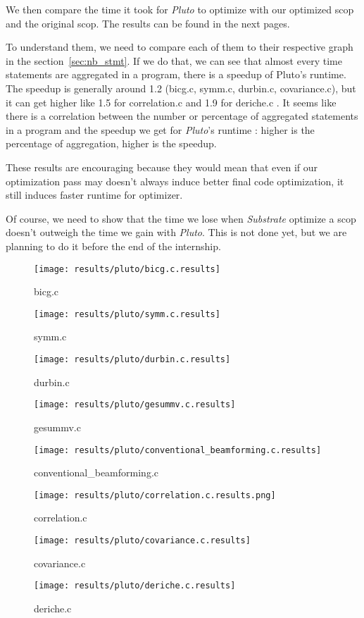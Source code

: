 \documentclass[paper=a4, fontsize=11.5pt]{scrartcl}
\numberwithin{equation}{section}        %
\numberwithin{figure}{section}          %
\numberwithin{table}{section}               %
\begin{document}
\bigskip

We then compare the time it took for \textit{Pluto} to optimize with our optimized scop and
the original scop. The results can be found in the next pages.

To understand them, we need to compare each of them to their respective graph in the section~\ref{sec:nb_stmt}.
If we do that, we can see that almost every time statements are aggregated in a program,
there is a speedup of Pluto's runtime. The speedup is generally around 1.2 (bicg.c, symm.c, durbin.c, covariance.c),
but it can get higher like 1.5 for correlation.c and 1.9 for deriche.c . It seems like there
is a correlation between the number or percentage of aggregated statements in a program and
the speedup we get for \textit{Pluto}'s runtime : higher is the percentage of aggregation,
higher is the speedup.

\bigskip

These results are encouraging because they would mean that even if our optimization pass
may doesn't always induce better final code optimization, it still induces faster runtime
for optimizer.

\bigskip

Of course, we need to show that the time we lose when \textit{Substrate} optimize a scop
doesn't outweigh the time we gain with \textit{Pluto}. This is not done yet, but we are planning
to do it before the end of the internship.


\begin{figure}[H]
    \center
    \texttt{[image: results/pluto/bicg.c.results]}
    \caption{bicg.c}\label{fig:pluto:bicg}
    \texttt{[image: results/pluto/symm.c.results]}
    \caption{symm.c}\label{fig:pluto:symm}
\end{figure}
\begin{figure}[H]
    \center
    \texttt{[image: results/pluto/durbin.c.results]}
    \caption{durbin.c}\label{fig:pluto:durbin}
    \texttt{[image: results/pluto/gesummv.c.results]}
    \caption{gesummv.c}\label{fig:pluto:gesummv}
\end{figure}
\begin{figure}[H]
    \center
    \texttt{[image: results/pluto/conventional\_beamforming.c.results]}
    \caption{conventional\_beamforming.c}\label{fig:pluto:conv_beam}
    \texttt{[image: results/pluto/correlation.c.results.png]}
    \caption{correlation.c}\label{fig:pluto:correlation}
\end{figure}
\begin{figure}[H]
    \center
    \texttt{[image: results/pluto/covariance.c.results]}
    \caption{covariance.c}\label{fig:pluto:covariance}
    \texttt{[image: results/pluto/deriche.c.results]}
    \caption{deriche.c}\label{fig:pluto:deriche}
\end{figure}
\restoregeometry
\end{document}
